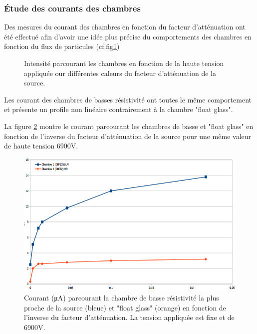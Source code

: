 \subsubsection{Étude des courants des chambres}
Des mesures du courant des chambres en fonction du facteur d'atténuation ont été effectué afin d'avoir une idée plus précise du comportements des chambres en fonction du flux de particules (cf.fig\ref{courant})

\begin{figure}[ht!]
	\centering
	\hfill
	\caption{Intensité parcourant les chambres en fonction de la haute tension appliquée our différentes caleurs du facteur d'atténuation de la source.}
	\label{courant}
\end{figure}


Les courant des chambres de basses résistivité ont toutes le même comportement et présente un profile non linéaire contrairement à la chambre "float glass".

La figure \ref{currentsamHV} montre le courant parcourant les chambres de basse et "float glass" en fonction de l'inverse du facteur d'atténuation de la source pour une même valeur de haute tension 6900V.

\begin{figure}[ht!]
	\centering
	\includegraphics[width=.6\linewidth]{GLA/current_same_HV.png}
	\caption{Courant (\si{\micro\ampere}) parcourant la chambre de basse résistivité la plus proche de la source (bleue) et "float glass" (orange) en fonction de l'inverse du facteur d'atténuation. La tension appliquée est fixe et de 6900V.}
	\label{currentsamHV}
\end{figure}

